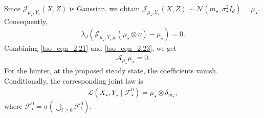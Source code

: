 \documentclass{article}
\numberwithin{equation}{section}
\begin{document}
Since $\mathcal J_{\mu_\star,Y_\star}(X,Z)$ is Gaussian, we obtain $\mathcal J_{\mu_\star,Y_\star}(X,Z)
    \sim
    \mathcal N(m_\star,\sigma_\star^2I_d) =  \mu_\star$. 
Consequently,
\begin{align}
    \lambda_J \left(\mathcal J_{\mu_\star,Y_\star\#}
    (\mu_\star\otimes\nu) -  \mu_\star
    \right)  =  0. \label{tso_eqn_2.23}
\end{align}
Combining \eqref{tso_eqn_2.21} and \eqref{tso_eqn_2.23}, we get
\begin{align}
    \mathcal{A}_{\mu_\star} \mu_\star = 0. 
\end{align}
For the hunter, at the proposed steady state, the coefficients vanish.  Conditionally, the corresponding joint law is
\begin{align}
    \mathcal L(X_\star,Y_\star\mid\mathcal F_\star^0)
    =
    \mu_\star\otimes\delta_{m_\star},
\end{align}
where $\mathcal{F}_\star^0 = \mathrm{\sigma}(\bigcup_{t \geq 0}\mathcal{F}_t^0)$.
\end{document}
